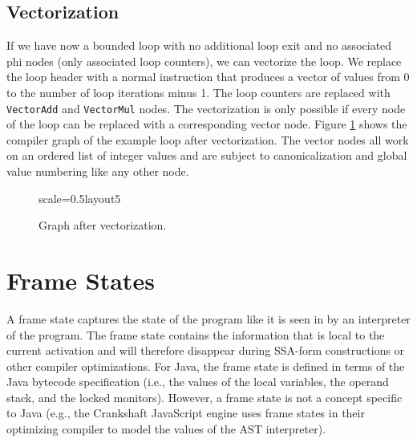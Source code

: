 \documentclass[twocolumn]{svjour3}
\begin{document}
\subsection{Vectorization}

If we have now a bounded loop with no additional loop exit and no associated phi nodes (only associated loop counters), we can vectorize the loop.
We replace the loop header with a normal instruction that produces a vector of values from 0 to the number of loop iterations minus 1.
The loop counters are replaced with \texttt{VectorAdd} and \texttt{VectorMul} nodes.
The vectorization is only possible if every node of the loop can be replaced with a corresponding vector node.
Figure \ref{fig:loop5} shows the compiler graph of the example loop after vectorization.
The vector nodes all work on an ordered list of integer values and are subject to canonicalization and global value numbering like any other node.


\begin{figure}[ht]
  \centering
\begin{digraphenv}{scale=0.5}{layout5}
\end{digraphenv}
  \caption{Graph after vectorization.}
  \label{fig:loop5}
\end{figure}


\section{Frame States}
A frame state captures the state of the program like it is seen in by an interpreter of the program.
The frame state contains the information that is local to the current activation and will therefore disappear during SSA-form constructions or other compiler optimizations.
For Java, the frame state is defined in terms of the Java bytecode specification (i.e., the values of the local variables, the operand stack, and the locked monitors).
However, a frame state is not a concept specific to Java (e.g., the Crankshaft JavaScript engine uses frame states in their optimizing compiler to model the values of the AST interpreter).
\end{document}
